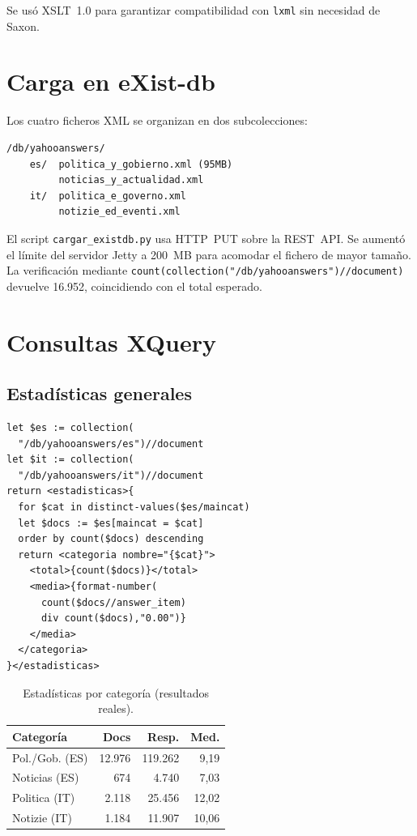 \documentclass[10pt,twocolumn,a4paper]{article}
\begin{document}
Se us\'o XSLT~1.0 para garantizar compatibilidad con \texttt{lxml} sin necesidad de Saxon.

\section{Carga en eXist-db}

Los cuatro ficheros XML se organizan en dos subcolecciones:

\begin{lstlisting}[caption={Colecciones en eXist-db.}, xleftmargin=0.5cm]
/db/yahooanswers/
    es/  politica_y_gobierno.xml (95MB)
         noticias_y_actualidad.xml
    it/  politica_e_governo.xml
         notizie_ed_eventi.xml
\end{lstlisting}

El script \texttt{cargar\_existdb.py} usa HTTP~PUT sobre la REST~API.
Se aument\'o el l\'imite del servidor Jetty a 200~MB para acomodar
el fichero de mayor tama\~no. La verificaci\'on mediante
\texttt{count(collection("/db/yahooanswers")//document)}
devuelve 16.952, coincidiendo con el total esperado.

\section{Consultas XQuery}

\subsection{Estad\'isticas generales}

\begin{lstlisting}[language=XQuery,caption={Estadisticas por categoria.}, xleftmargin=0.5cm]
let $es := collection(
  "/db/yahooanswers/es")//document
let $it := collection(
  "/db/yahooanswers/it")//document
return <estadisticas>{
  for $cat in distinct-values($es/maincat)
  let $docs := $es[maincat = $cat]
  order by count($docs) descending
  return <categoria nombre="{$cat}">
    <total>{count($docs)}</total>
    <media>{format-number(
      count($docs//answer_item)
      div count($docs),"0.00")}
    </media>
  </categoria>
}</estadisticas>
\end{lstlisting}

\begin{table}[H]
\centering
\caption{Estad\'isticas por categor\'ia (resultados reales).}
\label{tab:stats}
\begin{tabular}{p{2.0cm}rrr}
\toprule
\textbf{Categor\'ia} & \textbf{Docs} & \textbf{Resp.} & \textbf{Med.} \\
\midrule
Pol./Gob. (ES) & 12.976 & 119.262 & 9,19 \\
Noticias (ES)  &    674 &   4.740 & 7,03 \\
Politica (IT)  &  2.118 &  25.456 & 12,02 \\
Notizie (IT)   &  1.184 &  11.907 & 10,06 \\
\bottomrule
\end{tabular}
\end{table}
\end{document}
